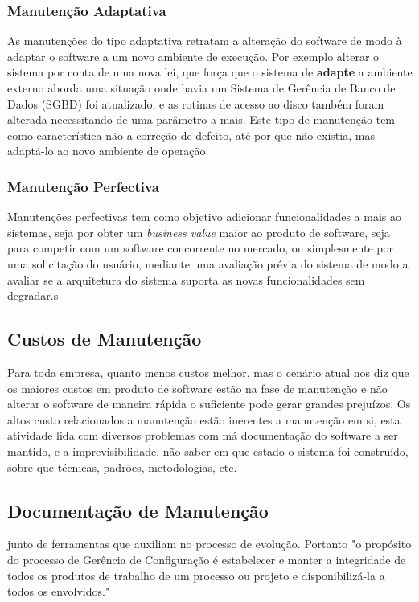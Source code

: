 \subsubsection{Manutenção Adaptativa}
As manutenções do tipo adaptativa retratam a alteração do software de modo à adaptar o software a um novo ambiente de execução. Por exemplo alterar o sistema por conta de uma nova lei, que força que o sistema de \textbf{adapte} a ambiente externo aborda uma situação onde havia um Sistema de  Gerência de Banco de Dados (SGBD) foi atualizado, e as rotinas de acesso ao disco também foram alterada necessitando de uma parâmetro a mais. Este tipo de manutenção tem como característica não a correção de defeito, até por que não existia, mas adaptá-lo ao novo ambiente de operação.
\subsubsection{Manutenção Perfectiva}
Manutenções perfectivas tem como objetivo adicionar funcionalidades a mais ao sistemas, seja por obter um \textit{business value} maior ao produto de software, seja para competir com um software concorrente no mercado, ou simplesmente por uma solicitação do usuário, mediante uma avaliação prévia  do sistema de modo a avaliar se a arquitetura do sistema suporta as novas funcionalidades sem degradar.s
\subsection{Custos de Manutenção}
Para toda empresa, quanto menos custos melhor, mas o cenário atual nos diz que os maiores custos em produto de software estão na fase de manutenção
e não alterar o software de maneira rápida o suficiente pode gerar grandes prejuízos. Os altos custo relacionados a manutenção estão inerentes a manutenção em si, esta atividade lida com diversos problemas com má documentação do software a ser mantido, e a imprevisibilidade, não saber em que estado o sistema foi construído, sobre que técnicas, padrões, metodologias, etc. 
\subsection{Documentação de Manutenção}junto de ferramentas que auxiliam no processo de evolução.
Portanto "o propósito do processo de Gerência de Configuração é estabelecer e manter a integridade de todos os produtos de trabalho de um processo ou projeto e disponibilizá-la a todos os envolvidos."

